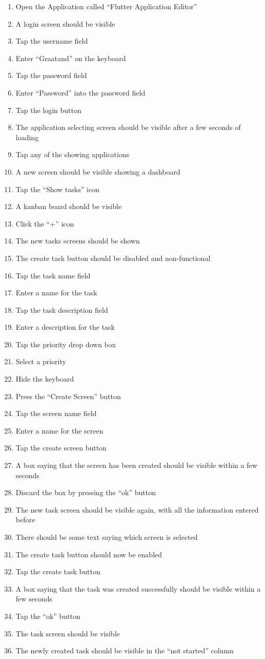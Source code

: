 \begin{enumerate}
    \item Open the Application called “Flutter Application Editor”
    \item A login screen should be visible
    \item Tap the username field
    \item Enter “Graatand” on the keyboard
    \item Tap the password field
    \item Enter “Password” into the password field
    \item Tap the login button
    \item The application selecting screen should be visible after a few seconds of loading
    \item Tap any of the showing applications
    \item A new screen should be visible showing a dashboard
    \item Tap the “Show tasks” icon
    \item A kanban board should be visible
    \item Click the “+” icon
    \item The new tasks screens should be shown
    \item The create task button should be disabled and non-functional 
    \item Tap the task name field
    \item Enter a name for the task
    \item Tap the task description field
    \item Enter a description for the task
    \item Tap the priority drop down box
    \item Select a priority
    \item Hide the keyboard
    \item Press the “Create Screen” button
    \item Tap the screen name field
    \item Enter a name for the screen
    \item Tap the create screen button
    \item A box saying that the screen has been created should be visible within a few seconds
    \item Discard the box by pressing the “ok” button
    \item The new task screen should be visible again, with all the information entered before
    \item There should be some text saying which screen is selected
    \item The create task button should now be enabled
    \item Tap the create task button
    \item A box saying that the task was created successfully should be visible within a few seconds
    \item Tap the “ok” button
    \item The task screen should be visible
    \item The newly created task should be visible in the “not started” column
\end{enumerate}
